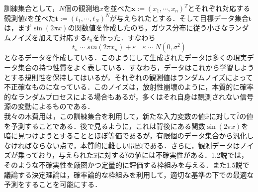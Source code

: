 \documentclass{jsarticle}
\theoremstyle{definition}
\begin{document}
\large

訓練集合として，$N$個の観測地$x$を並べた${\bm x}:=(x_1,\cdots,x_n)^T $とそれぞれ対応する観測値$t$を並べた${\bm t}:= (t_1,\cdots,t_N)^N$が与えられたとする．そして目標データ集合${\bm t}$は，まず$\sin(2\pi x)$の関数値を作成したのち，ガウス分布に従う小さなランダムノイズを加えて対応する$t_n$を作った．すなわち
$$t_n \sim sin(2\pi x_n) + \varepsilon \quad \varepsilon \sim N(0,\sigma^2)$$
となるデータを作成している．このようにして生成されたデータは多くの現実データ集合の持つ性質をよく表している．すなわち，データはこれから学習しようとする規則性を保持してはいるが，それぞれの観測値はランダムノイズによって不正確なものになっている．このノイズは，放射性崩壊のように，本質的に確率的なランダムプロセスによる場合もあるが，多くはそれ自身は観測されない信号源の変動によるものである．\\

我々の木費用は，この訓練集合を利用して，新たな入力変数の値$\hat{x}$に対して$\hat{t}$の値を予測することである．後で見るように，これは背後にある関数$\sin (2\pi x)$を暗に見つけようとすることとほぼ等価であるが，有限個のデータ集合から汎化しなければならない点で，本質的に難しい問題である．さらに，観測データはノイズが乗っており，与えられた$\hat{x}$に対する$\hat t$の値には不確実性がある．1.2説では，そのような不確実性を厳密かつ定量的に評価する枠組みを与える．また1.5説で議論する決定理論は，確率論的な枠組みを利用して，適切な基準の下での最適な予測をすることを可能にする．\\
\end{document}
